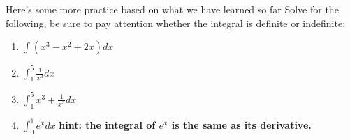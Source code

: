 \documentclass[
  ignorenonframetext,
]{beamer}
\providecommand{\tightlist}{%
  \setlength{\itemsep}{0pt}\setlength{\parskip}{0pt}}
\begin{document}
\begin{frame}{Here's some more practice based on what we have learned so
far}
\protect\hypertarget{heres-some-more-practice-based-on-what-we-have-learned-so-far}{}
Solve for the following, be sure to pay attention whether the integral
is definite or indefinite: \small 

\begin{enumerate}
\tightlist
\item
  \(\int(x^3-x^2+2x)dx\)
\end{enumerate}


\begin{enumerate}
\setcounter{enumi}{1}
\tightlist
\item
  \(\int^5_1 \frac{1}{x^3}dx\)
\end{enumerate}


\begin{enumerate}
\setcounter{enumi}{2}
\tightlist
\item
  \(\int^5_1 x^3+ \frac{1}{x^3}dx\)
\end{enumerate}


\begin{enumerate}
\setcounter{enumi}{3}
\tightlist
\item
  \(\int^{1}_0 e^x dx\) \textbf{hint: the integral of \(e^x\) is the
  same as its derivative.}
\end{enumerate}

\end{frame}
\end{document}
